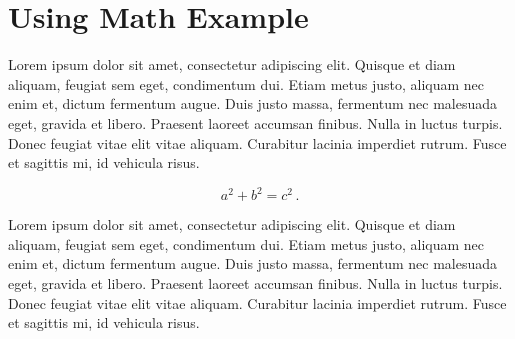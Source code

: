 %
%
%

\section{\label{sec:usingmath}Using Math Example}

Lorem ipsum dolor sit amet, consectetur adipiscing elit. Quisque et diam aliquam, feugiat sem eget, condimentum dui.
Etiam metus justo, aliquam nec enim et, dictum fermentum augue. Duis justo massa, fermentum nec malesuada eget, gravida
et libero. Praesent laoreet accumsan finibus. Nulla in luctus turpis. Donec feugiat vitae elit vitae aliquam. Curabitur
lacinia imperdiet rutrum. Fusce et sagittis mi, id vehicula risus.

\begin{equation}
	a^2+b^2=c^2 \,.
	\label{eqn:pythagoras}
\end{equation}

Lorem ipsum dolor sit amet, consectetur adipiscing elit. Quisque et diam aliquam, feugiat sem eget, condimentum dui.
Etiam metus justo, aliquam nec enim et, dictum fermentum augue. Duis justo massa, fermentum nec malesuada eget, gravida
et libero. Praesent laoreet accumsan finibus. Nulla in luctus turpis. Donec feugiat vitae elit vitae aliquam. Curabitur
lacinia imperdiet rutrum. Fusce et sagittis mi, id vehicula risus.
